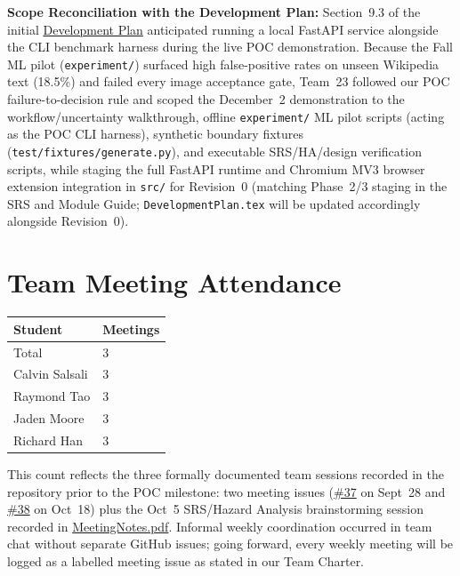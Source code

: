 \documentclass{article}
\begin{document}
\noindent \textbf{Scope Reconciliation with the Development Plan:} Section~9.3 of the initial \href{https://github.com/richy1337/Verity/blob/main/pdfs/DevelopmentPlan/DevelopmentPlan.pdf}{Development Plan} anticipated running a local FastAPI service alongside the CLI benchmark harness during the live POC demonstration. Because the Fall ML pilot (\texttt{experiment/}) surfaced high false-positive rates on unseen Wikipedia text (18.5\%) and failed every image acceptance gate, Team~23 followed our POC failure-to-decision rule and scoped the December~2 demonstration to the workflow/uncertainty walkthrough, offline \texttt{experiment/} ML pilot scripts (acting as the POC CLI harness), synthetic boundary fixtures (\texttt{test/fixtures/generate.py}), and executable SRS/HA/design verification scripts, while staging the full FastAPI runtime and Chromium MV3 browser extension integration in \texttt{src/} for Revision~0 (matching Phase~2/3 staging in the SRS and Module Guide; \texttt{DevelopmentPlan.tex} will be updated accordingly alongside Revision~0).

\section{Team Meeting Attendance}

\begin{table}[H]
\centering
\begin{tabular}{ll}
\toprule
\textbf{Student} & \textbf{Meetings}\\
\midrule
Total & 3\\
Calvin Salsali & 3\\
Raymond Tao & 3\\
Jaden Moore & 3\\
Richard Han & 3\\
\bottomrule
\end{tabular}
\end{table}

This count reflects the three formally documented team sessions recorded in the repository prior to the POC milestone: two meeting issues (\href{https://github.com/richy1337/Verity/issues/37}{\#37} on Sept~28 and \href{https://github.com/richy1337/Verity/issues/38}{\#38} on Oct~18) plus the Oct~5 SRS/Hazard Analysis brainstorming session recorded in \href{https://github.com/richy1337/Verity/blob/main/pdfs/projMngmnt/MeetingNotes.pdf}{MeetingNotes.pdf}. Informal weekly coordination occurred in team chat without separate GitHub issues; going forward, every weekly meeting will be logged as a labelled meeting issue as stated in our Team Charter.
\end{document}
